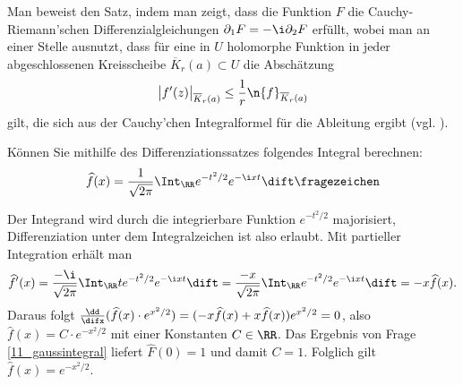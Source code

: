 \begin{antwort}
  Man beweist den Satz, indem man zeigt, dass die Funktion $F$ 
  die Cauchy-Riemann'schen Differenzialgleichungen 
  $\partial_1 F = -\i \partial_2 F$ erfüllt, wobei man an einer 
  Stelle ausnutzt, dass für eine in $U$ holomorphe Funktion 
  in jeder abgeschlossenen Kreisscheibe $\overline{K}_{r}(a) \subset U$ 
  die Abschätzung 
  \[
  \big| f'(z) \big|_{\overline{K}_{r}(a)} 
  \le \frac{1}{r} \n{ f }_{\overline{K}_{r}(a)} 
  \]
  gilt, die sich aus der Cauchy'chen Integralformel 
  für die Ableitung ergibt (vgl. \citep{Freitag}). \AntEnd 
\end{antwort}

\begin{frage}\label{11_fouri}
  Können Sie mithilfe des Differenziationssatzes folgendes Integral berechnen: 
  \[
  \widehat{f}(x) = \frac{1}{\sqrt{2\pi}} \Int_\RR e^{-t^2/2} e^{-\i xt}\dift 
  \fragezeichen
  \]
\end{frage}

\begin{antwort}
  Der Integrand wird durch die integrierbare Funktion $e^{-t^2/2}$ majorisiert, 
  Differenziation unter dem Integralzeichen ist also erlaubt. Mit partieller 
  Integration erhält man
  \[
  \widehat{f}'(x) = \frac{-\i}{\sqrt{2\pi}} \Int_\RR te^{-t^2/2} e^{-\i xt}\dift
  = \frac{-x}{\sqrt{2\pi}} \Int_\RR e^{-t^2/2} e^{-\i xt} \dift
  =-x \widehat{f}(x).
  \]
  Daraus folgt $\frac{\dd}{\difx}(\widehat{f}(x) \cdot e^{x^2/2})=
  (-x\widehat{f}(x)+x\widehat{f}(x))e^{x^2/2}=0$,  
  also $\widehat{f}(x)=C\cdot e^{-x^2/2}$ mit einer Konstanten 
  $C\in\RR$. Das Ergebnis von Frage \ref{11_gaussintegral} liefert 
  $\widehat{F}(0)=1$ und damit $C=1$. Folglich gilt 
  $\widehat{f}(x)= e^{-x^2/2}$.
  \AntEnd
\end{antwort}

